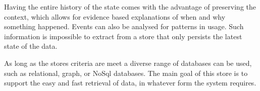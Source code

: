 Having the entire history of the state comes with the advantage of preserving the context, which allows for evidence based explanations of when and why something happened. Events can also be analysed for patterns in usage. Such information is impossible to extract from a store that only persists the latest state of the data.

As long as the stores criteria are meet a diverse range of databases can be used, such as relational, graph, or NoSql databases. The main goal of this store is to support the easy and fast retrieval of data, in whatever form the system requires.





